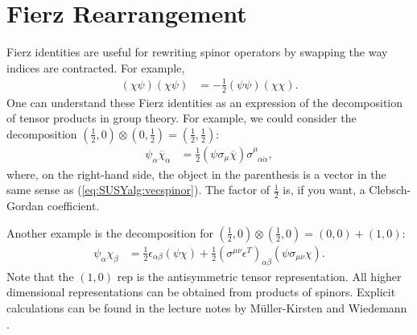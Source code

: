 \documentclass[12pt]{article}
\numberwithin{equation}{section}    %
\begin{document}

\section{Fierz Rearrangement}\label{sec:SUSYalg:Fierz}

Fierz identities are useful for rewriting spinor operators by swapping the way indices are contracted. For example,
\begin{align}
	(\chi\psi)(\chi\psi) &= -\frac 12 (\psi\psi)(\chi\chi)\label{eq:SUSYalg:Fierz:alphaalphadot}.
\end{align}
%
One can understand these Fierz identities as an expression of the decomposition of tensor products in group theory. For example, we could consider the decomposition $(\frac 12,0)\otimes(0,\frac 12)=(\frac 12, \frac 12)$:
\begin{align}
	\psi_\alpha\overline\chi_{\dot\alpha} &= \frac 12 (\psi\sigma_\mu\overline\chi)\sigma^{\mu}_{\phantom\mu\alpha\dot\alpha},\label{eq:SUSYalg:fierz:sigma}
\end{align}
where, on the right-hand side, the object in the parenthesis is a vector in the same sense as  (\ref{eq:SUSYalg:vecspinor}). The factor of $\frac 12$ is, if you want, a Clebsch-Gordan coefficient.

Another example is the decomposition for $(\frac 12,0)\otimes(\frac 12,0)=(0,0)+(1,0)$:
\begin{align}
	\psi_\alpha\chi_\beta &= \frac 12 \epsilon_{\alpha\beta}(\psi\chi) + \frac 12 (\sigma^{\mu\nu}\epsilon^T)_{\alpha\beta}(\psi\sigma_{\mu\nu}\chi).
\end{align}
Note that the $(1,0)$ rep is the antisymmetric tensor representation. All higher dimensional representations can be obtained from products of spinors. Explicit calculations can be found in the lecture notes by M\"uller-Kirsten and Wiedemann \cite{MullerKirsten:1986cw}.
\end{document}
